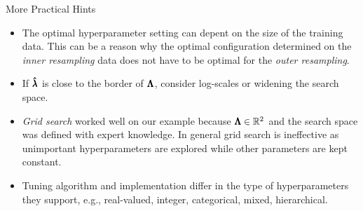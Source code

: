 \begin{frame}[allowframebreaks]{More Practical Hints}
\begin{itemize}
  \item The optimal hyperparameter setting can depent on the size of the training data. This can be a reason why the optimal configuration determined on the \emph{inner resampling} data does not have to be optimal for the \emph{outer resampling}.

  \item If $\pmb{\hat{\lambda}}$ is close to the border of $\pmb{\Lambda}$, consider log-scales or widening the search space.

  \item \begin{minipage}[t]{.55\linewidth}\raggedright
          \emph{Grid search} worked well on our example because $\pmb{\Lambda} \in \mathbb{R}^2$ and the search space was defined with expert knowledge. In general grid search is ineffective as unimportant hyperparameters are explored while other parameters are kept constant.
        \end{minipage}%
        \begin{minipage}[t]{.4\linewidth}
        \end{minipage}

\frambreak

  \item Tuning algorithm and implementation differ in the type of hyperparameters they support, e.g., real-valued, integer, categorical, mixed, hierarchical.


\end{itemize}
\end{frame}
